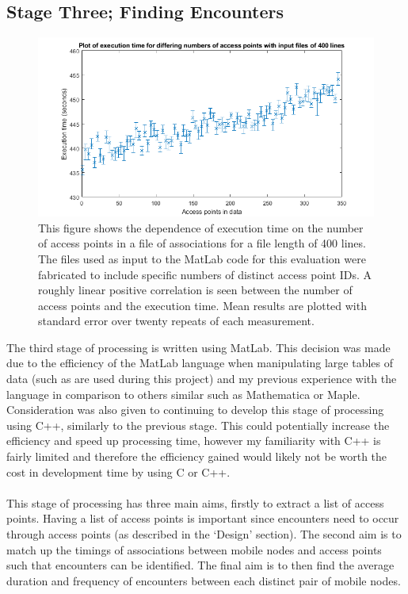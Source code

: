 \subsection{Stage Three; Finding Encounters} 
\label{section:impl_stage3}
\begin{figure}[h]
    \centering
    \includegraphics[width=\textwidth]{ap_vs_time.png}
    \caption{This figure shows the dependence of execution time on the number of access points in a file of associations for a file length of 400 lines. The files used as input to the MatLab code for this evaluation were fabricated to include specific numbers of distinct access point IDs. A roughly linear positive correlation is seen between the number of access points and the execution time. Mean results are plotted with standard error over twenty repeats of each measurement.}
    \label{fig:AP_vs_time}
\end{figure}

The third stage of processing is written using MatLab. This decision was made due to the efficiency of the MatLab language when manipulating large tables of data (such as are used during this project) and my previous experience with the language in comparison to others similar such as Mathematica or Maple. Consideration was also given to continuing to develop this stage of processing using C++, similarly to the previous stage. This could potentially increase the efficiency and speed up processing time, however my familiarity with C++ is fairly limited and therefore the efficiency gained would likely not be worth the cost in development time by using C or C++.\\\\
This stage of processing has three main aims, firstly to extract a list of access points. Having a list of access points is important since encounters need to occur through access points (as described in the `Design' section). The second aim is to match up the timings of associations between mobile nodes and access points such that encounters can be identified. The final aim is to then find the average duration and frequency of encounters between each distinct pair of mobile nodes. 

